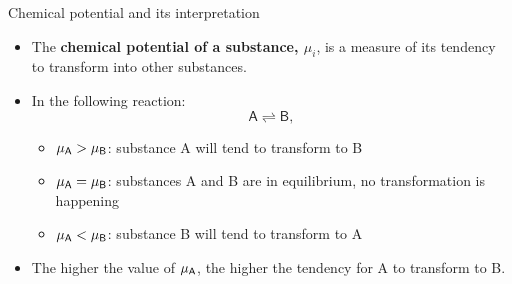 \begin{frame}{Chemical potential and its interpretation}

\begin{itemize}[<+->]
\item The \textbf{chemical potential of a substance, $\mu_{i}$}, is a measure of
its tendency to transform into other substances.
\item In the following reaction:
\[
\mathsf{A\rightleftharpoons B},
\]

\begin{itemize}
\item $\mu_{\sf A}>\mu_{\sf B}$: substance A will tend to transform to B 
\item $\mu_{\sf A}=\mu_{\sf B}$: substances A and B are in equilibrium, no
transformation is happening
\item $\mu_{\sf A}<\mu_{\sf B}$: substance B will tend to transform to A
\end{itemize}
\item The higher the value of $\mu_{\sf A}$, the higher the tendency for A
to transform to B.
\end{itemize}
\end{frame}
%
%
